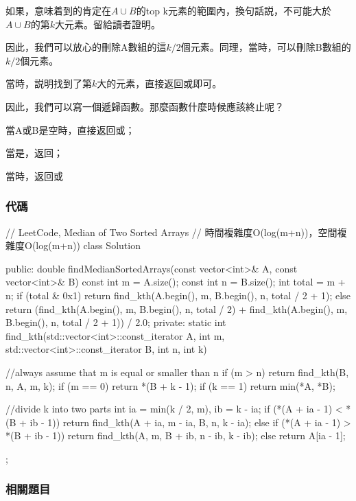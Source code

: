 如果，意味着到的肯定在$A \cup B$的top k元素的範圍內，換句話説，不可能大於$A \cup B$的第$k$大元素。留給讀者證明。

因此，我們可以放心的刪除A數組的這$k/2$個元素。同理，當時，可以刪除B數組的$k/2$個元素。

當時，説明找到了第$k$大的元素，直接返回或即可。

因此，我們可以寫一個遞歸函數。那麼函數什麼時候應該終止呢？
\begindot
\item 當A或B是空時，直接返回或；
\item 當是，返回；
\item 當時，返回或
\myenddot


\subsubsection{代碼}
\begin{Code}
// LeetCode, Median of Two Sorted Arrays
// 時間複雜度O(log(m+n))，空間複雜度O(log(m+n))
class Solution {
public:
    double findMedianSortedArrays(const vector<int>& A, const vector<int>& B) {
        const int m = A.size();
        const int n = B.size();
        int total = m + n;
        if (total & 0x1)
            return find_kth(A.begin(), m, B.begin(), n, total / 2 + 1);
        else
            return (find_kth(A.begin(), m, B.begin(), n, total / 2)
                    + find_kth(A.begin(), m, B.begin(), n, total / 2 + 1)) / 2.0;
    }
private:
    static int find_kth(std::vector<int>::const_iterator A, int m,
            std::vector<int>::const_iterator B, int n, int k) {
        //always assume that m is equal or smaller than n
        if (m > n) return find_kth(B, n, A, m, k);
        if (m == 0) return *(B + k - 1);
        if (k == 1) return min(*A, *B);

        //divide k into two parts
        int ia = min(k / 2, m), ib = k - ia;
        if (*(A + ia - 1) < *(B + ib - 1))
            return find_kth(A + ia, m - ia, B, n, k - ia);
        else if (*(A + ia - 1) > *(B + ib - 1))
            return find_kth(A, m, B + ib, n - ib, k - ib);
        else
            return A[ia - 1];
    }
};
\end{Code}


\subsubsection{相關題目}

